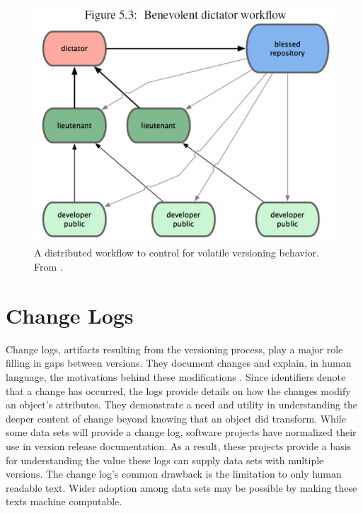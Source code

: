 \begin{figure}
	\centering
	\includegraphics[scale=0.85]{figures/federatedGit.png}
	\caption{A distributed workflow to control for volatile versioning behavior.  From  \cite{cederqvist2002version}.}
	\label{fig:federated}
\end{figure}

\section{Change Logs} \label{sec:changelog}

Change logs, artifacts resulting from the versioning process, play a major role filling in gaps between versions.
They document changes and explain, in human language, the motivations behind these modifications \cite{uel1037}.
Since identifiers denote that a change has occurred, the logs provide details on how the changes modify an object's attributes.
They demonstrate a need and utility in understanding the deeper content of change beyond knowing that an object did transform.
While some data sets will provide a change log, software projects have normalized their use in version release documentation.
As a result, these projects provide a basis for understanding the value these logs can supply data sets with multiple versions.
The change log's common drawback is the limitation to only human readable text.
Wider adoption among data sets may be possible by making these texts machine computable.

